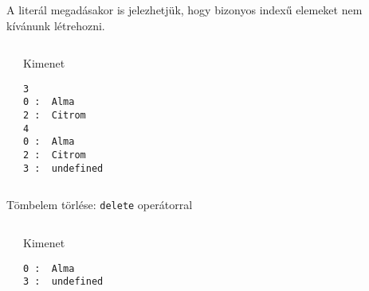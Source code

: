 \begin{frame}[fragile]
  A literál megadásakor is jelezhetjük, hogy bizonyos indexű elemeket nem kívánunk létrehozni.
  \small
  \begin{columns}[T]
      \begin{exampleblock}{}
        
      \end{exampleblock}
      \begin{block}{Kimenet}
        \begin{verbatim}
3
0 :  Alma
2 :  Citrom
4
0 :  Alma
2 :  Citrom
3 :  undefined
\end{verbatim}
      \end{block}
  \end{columns}
\end{frame}

\begin{frame}[fragile]
  Tömbelem törlése: \texttt{delete} operátorral
  \vfill
  \small
  \begin{columns}[T]
      \begin{exampleblock}{}
        
      \end{exampleblock}
      \begin{block}{Kimenet}
        \begin{verbatim}
0 :  Alma
3 :  undefined
\end{verbatim}
      \end{block}
  \end{columns}
\end{frame}

